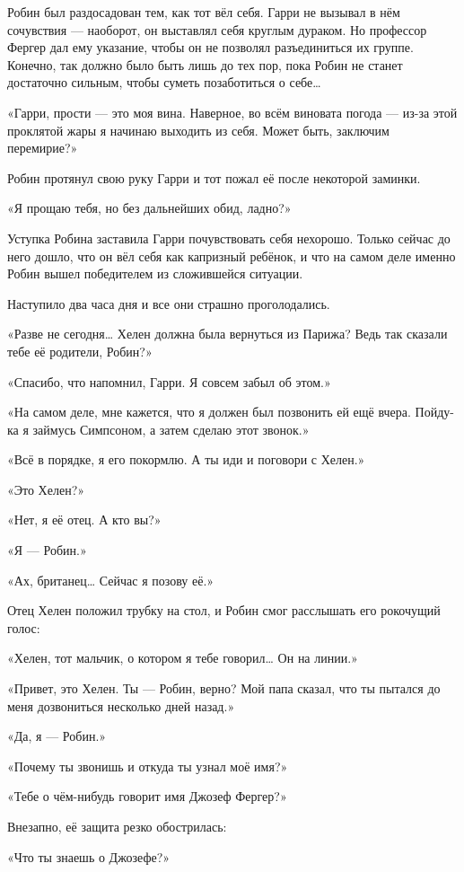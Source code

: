 \documentclass[a5paper, 9pt,
final, openany, twoside=true]{memoir}
\begin{document}
Робин был раздосадован тем, как тот вёл себя. Гарри не вызывал в нём сочувствия — наоборот, он выставлял себя круглым дураком. Но профессор Фергер дал ему указание, чтобы он не позволял разъединиться их группе. Конечно, так должно было быть лишь до тех пор, пока Робин не станет достаточно сильным, чтобы суметь позаботиться о себе…\bigskip

«Гарри, прости — это моя вина. Наверное, во всём виновата погода — из-за этой проклятой жары я начинаю выходить из себя. Может быть, заключим перемирие?»

Робин протянул свою руку Гарри и тот пожал её после некоторой заминки.

«Я прощаю тебя, но без дальнейших обид, ладно?»

Уступка Робина заставила Гарри почувствовать себя нехорошо. Только сейчас до него дошло, что он вёл себя как капризный ребёнок, и что на самом деле именно Робин вышел победителем из сложившейся ситуации.

Наступило два часа дня и все они страшно проголодались.

«Разве не сегодня… Хелен должна была вернуться из Парижа? Ведь так сказали тебе её родители, Робин?»

«Спасибо, что напомнил, Гарри. Я совсем забыл об этом.»

«На самом деле, мне кажется, что я должен был позвонить ей ещё вчера. Пойду-ка я займусь Симпсоном, а затем сделаю этот звонок.»

«Всё в порядке, я его покормлю. А ты иди и поговори с Хелен.»\bigskip

«Это Хелен?»

«Нет, я её отец. А кто вы?»

«Я — Робин.»

«Ах, британец… Сейчас я позову её.»

Отец Хелен положил трубку на стол, и Робин смог расслышать его рокочущий голос:

«Хелен, тот мальчик, о котором я тебе говорил… Он на линии.»\bigskip

«Привет, это Хелен. Ты — Робин, верно? Мой папа сказал, что ты пытался до меня дозвониться несколько дней назад.»

«Да, я — Робин.»

«Почему ты звонишь и откуда ты узнал моё имя?»

«Тебе о чём-нибудь говорит имя Джозеф Фергер?»

Внезапно, её защита резко обострилась:

«Что ты знаешь о Джозефе?»
\end{document}
